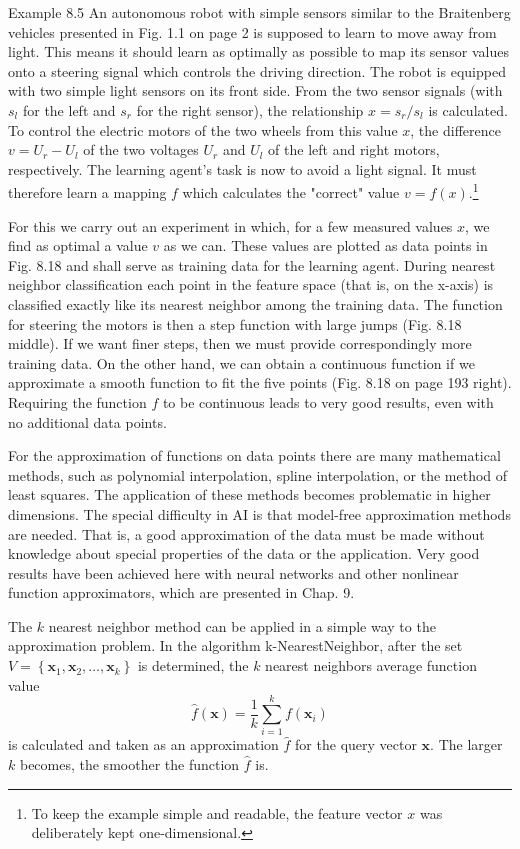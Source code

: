 \documentclass[10pt]{book}
\begin{document}
Example 8.5 An autonomous robot with simple sensors similar to the Braitenberg vehicles presented in Fig. 1.1 on page 2 is supposed to learn to move away from light. This means it should learn as optimally as possible to map its sensor values onto a steering signal which controls the driving direction. The robot is equipped with two simple light sensors on its front side. From the two sensor signals (with $s_{l}$ for the left and $s_{r}$ for the right sensor), the relationship $x=s_{r} / s_{l}$ is calculated. To control the electric motors of the two wheels from this value $x$, the difference $v=U_{r}-U_{l}$ of the two voltages $U_{r}$ and $U_{l}$ of the left and right motors, respectively. The learning agent's task is now to avoid a light signal. It must therefore learn a mapping $f$ which calculates the "correct" value $v=f(x)$.\footnote{To keep the example simple and readable, the feature vector $x$ was deliberately kept one-dimensional.}

For this we carry out an experiment in which, for a few measured values $x$, we find as optimal a value $v$ as we can. These values are plotted as data points in Fig. 8.18 and shall serve as training data for the learning agent. During nearest neighbor classification each point in the feature space (that is, on the x-axis) is classified exactly like its nearest neighbor among the training data. The function for steering the motors is then a step function with large jumps (Fig. 8.18 middle). If we want finer steps, then we must provide correspondingly more training data. On the other hand, we can obtain a continuous function if we approximate a smooth function to fit the five points (Fig. 8.18 on page 193 right). Requiring the function $f$ to be continuous leads to very good results, even with no additional data points.

For the approximation of functions on data points there are many mathematical methods, such as polynomial interpolation, spline interpolation, or the method of least squares. The application of these methods becomes problematic in higher dimensions. The special difficulty in AI is that model-free approximation methods are needed. That is, a good approximation of the data must be made without knowledge about special properties of the data or the application. Very good results have been achieved here with neural networks and other nonlinear function approximators, which are presented in Chap. 9.

The $k$ nearest neighbor method can be applied in a simple way to the approximation problem. In the algorithm k-NearestNeighbor, after the set $V=\left\{\boldsymbol{x}_{1}, \boldsymbol{x}_{2}, \ldots, \boldsymbol{x}_{k}\right\}$ is determined, the $k$ nearest neighbors average function value
\begin{equation*}
\hat{f}(\boldsymbol{x})=\frac{1}{k} \sum_{i=1}^{k} f\left(\boldsymbol{x}_{i}\right) \tag{8.2}
\end{equation*}
is calculated and taken as an approximation $\hat{f}$ for the query vector $\boldsymbol{x}$. The larger $k$ becomes, the smoother the function $\hat{f}$ is.
\end{document}
